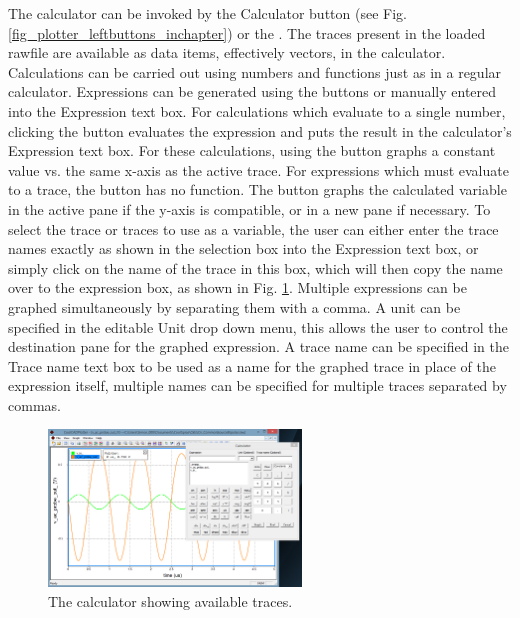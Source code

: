 The calculator can be invoked by the Calculator button (see Fig. \ref{fig_plotter_leftbuttons_inchapter}) or the .  The traces present in the loaded rawfile are available as data items, effectively vectors, in the calculator.  Calculations can be carried out using numbers and functions just as in a regular calculator. Expressions can be generated using the buttons or manually entered into the Expression text box. For calculations which evaluate to a single number, clicking the  button evaluates the expression and puts the result in the calculator's Expression text box.  For these calculations, using the  button graphs a constant value vs. the same x-axis as the active trace. For expressions which must evaluate to a trace, the  button has no function. The  button graphs the calculated variable in the active pane if the y-axis is compatible, or in a new pane if necessary. To select the trace or traces to use as a variable, the user can either enter the trace names exactly as shown in the selection box into the Expression text box, or simply click on the name of the trace in this box, which will then copy the name over to the expression box, as shown in Fig. \ref{fig_plotter_usingcalculator}. Multiple expressions can be graphed simultaneously by separating them with a comma. A unit can be specified in the editable Unit drop down menu, this allows the user to control the destination pane for the graphed expression. A trace name can be specified in the Trace name text box to be used as a name for the graphed trace in place of the expression itself, multiple names can be specified for multiple traces separated by commas.

\begin{figure}
    \includegraphics[width=0.6\textwidth]
		{./figures/plotter_netlist_editor_figures/Plotter_Calculator.png} %
    \caption{{The calculator showing available traces.}}
  \label{fig_plotter_usingcalculator}
\end{figure}

